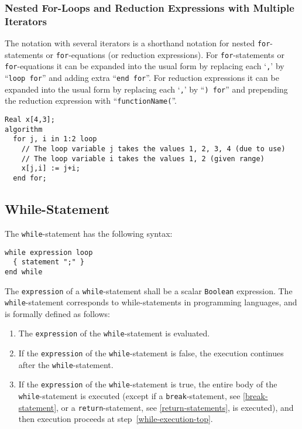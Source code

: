\subsubsection{Nested For-Loops and Reduction Expressions with Multiple Iterators}\label{nested-for-loops-and-reduction-expressions-with-multiple-iterators}

The notation with several iterators is a shorthand notation for nested \lstinline!for!-statements or \lstinline!for!-equations (or reduction expressions).
For \lstinline!for!-statements or \lstinline!for!-equations it can be expanded into the usual form by replacing each `\lstinline!,!' by ``\lstinline!loop for!'' and adding extra ``\lstinline!end for!''.
For reduction expressions it can be expanded into the usual form by replacing each `\lstinline!,!' by ``\lstinline!) for!'' and prepending the reduction expression with ``\lstinline!functionName(!''.

\begin{example}
\begin{lstlisting}[language=modelica]
  Real x[4,3];
algorithm
  for j, i in 1:2 loop
    // The loop variable j takes the values 1, 2, 3, 4 (due to use)
    // The loop variable i takes the values 1, 2 (given range)
    x[j,i] := j+i;
  end for;
\end{lstlisting}
\end{example}

\subsection{While-Statement}\label{while-statement}

The \lstinline!while!-statement has the following syntax:
\begin{lstlisting}[language=grammar]
while expression loop
  { statement ";" }
end while
\end{lstlisting}
The \lstinline!expression! of a \lstinline!while!-statement shall be a scalar \lstinline!Boolean! expression.
The \lstinline!while!-statement corresponds to while-statements in programming languages, and is formally defined as follows:
\begin{enumerate}
\item
  \label{while-execution-top}
  The \lstinline!expression! of the \lstinline!while!-statement is evaluated.
\item
  If the \lstinline!expression! of the \lstinline!while!-statement is false, the execution continues after the \lstinline!while!-statement.
\item
  If the \lstinline!expression! of the \lstinline!while!-statement is true, the entire body of the \lstinline!while!-statement is executed (except if a \lstinline!break!-statement, see \cref{break-statement}, or a \lstinline!return!-statement, see \cref{return-statements}, is executed), and then execution proceeds at step~\ref{while-execution-top}.
\end{enumerate}

